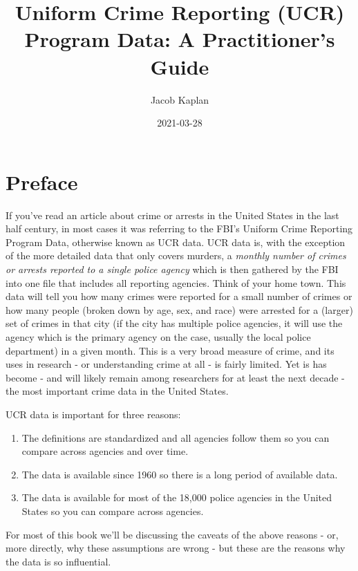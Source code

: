 \documentclass[
  12pt,
  openany]{book}
\title{Uniform Crime Reporting (UCR) Program Data: A Practitioner's Guide}
\author{Jacob Kaplan}
\date{2021-03-28}
\providecommand{\tightlist}{%
  \setlength{\itemsep}{0pt}\setlength{\parskip}{0pt}}
\begin{document}
\maketitle

{
\hypersetup{linkcolor=}
\setcounter{tocdepth}{2}
\tableofcontents
}
\hypertarget{preface}{%
\chapter{Preface}\label{preface}}

If you've read an article about crime or arrests in the United States in the last half century, in most cases it was referring to the FBI's Uniform Crime Reporting Program Data, otherwise known as UCR data. UCR data is, with the exception of the more detailed data that only covers murders, a \emph{monthly number of crimes or arrests reported to a single police agency} which is then gathered by the FBI into one file that includes all reporting agencies. Think of your home town. This data will tell you how many crimes were reported for a small number of crimes or how many people (broken down by age, sex, and race) were arrested for a (larger) set of crimes in that city (if the city has multiple police agencies, it will use the agency which is the primary agency on the case, usually the local police department) in a given month. This is a very broad measure of crime, and its uses in research - or understanding crime at all - is fairly limited. Yet is has become - and will likely remain among researchers for at least the next decade - the most important crime data in the United States.

UCR data is important for three reasons:

\begin{enumerate}
\def\labelenumi{\arabic{enumi}.}
\tightlist
\item
  The definitions are standardized and all agencies follow them so you can compare across agencies and over time.
\item
  The data is available since 1960 so there is a long period of available data.
\item
  The data is available for most of the 18,000 police agencies in the United States so you can compare across agencies.
\end{enumerate}

For most of this book we'll be discussing the caveats of the above reasons - or, more directly, why these assumptions are wrong - but these are the reasons why the data is so influential.
\end{document}
